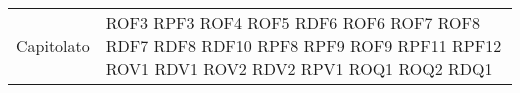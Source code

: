 \begin{longtable}{| p{5cm} | p{5cm} |}
		\rowcolor{LightGray}
		Capitolato & 	ROF3 \newline
						RPF3\newline
						ROF4\newline
						ROF5\newline
						RDF6\newline
						ROF6\newline
						ROF7\newline
						ROF8\newline
						RDF7\newline
						RDF8\newline
						RDF10\newline
						RPF8\newline
						RPF9\newline
						ROF9\newline
						RPF11\newline
						RPF12\newline
						ROV1\newline
						RDV1\newline
						ROV2\newline
						RDV2\newline
						RPV1\newline
						ROQ1\newline
						ROQ2\newline
						RDQ1 \\
		
		
		

\end{longtable}
